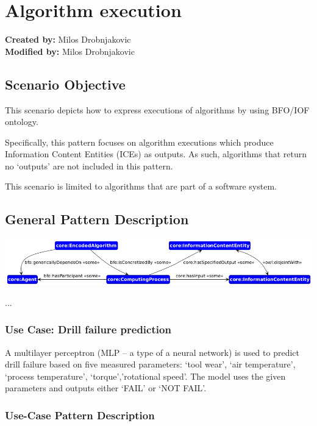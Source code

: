\section{Algorithm execution}
\label{sec-algorithm-execution}

\textbf{Created by:} Milos Drobnjakovic \\
\textbf{Modified by:} Milos Drobnjakovic \\

\subsection*{Scenario Objective}

This scenario depicts how to express executions of algorithms by using BFO/IOF ontology.

Specifically, this pattern focuses on algorithm executions which produce Information Content Entities (ICEs) as outputs. As such, algorithms that return no ‘outputs’ are not included in this pattern.

This scenario is limited to algorithms that are part of a software system.


\subsection*{General Pattern Description}
\includegraphics[scale=0.6]{scenarios/algorithm-execution/images/algorithm-execution-general.png}

...

\subsubsection*{Use Case: Drill failure prediction} 
A multilayer perceptron (MLP – a type of a neural network) is used to predict drill failure based on five measured parameters: ‘tool wear’, ‘air temperature’, ‘process temperature’, ‘torque’,’rotational speed’. The model uses the given parameters and outputs either ‘FAIL’ or ‘NOT FAIL’.

\subsubsection*{Use-Case Pattern Description}

